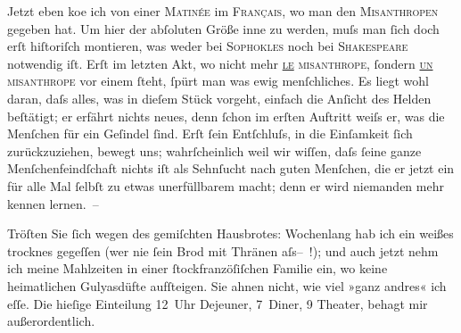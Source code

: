 \pstart
           Jetzt eben ko{\geminationm}e ich von einer \textsc{Matinée} im \textsc{Français}, wo man den \textsc{Misanthropen} gegeben hat. Um hier der abſoluten Größe inne zu werden, muſs man ſich doch
               erſt hiſtoriſch montieren, was weder bei \textsc{Sophokles} noch bei \textsc{Shakespeare} notwendig iſt. Erſt im letzten Akt, {\pb}wo nicht mehr
                  \textsc{\uline{le} misanthrope}, ſondern \textsc{\uline{un} misanthrope} vor einem ſteht, ſpürt man was
               ewig menſchliches. Es liegt wohl daran, daſs alles, was in dieſem Stück vorgeht, einfach die Anſicht des
               Helden beſtätigt; er erfährt nichts neues, denn ſchon im erſten Auftritt weiſs er,
               was die Menſchen für ein Geſindel ſind. Erſt ſein Entſchluſs, in die Einſamkeit ſich
               zurückzuziehen, bewegt uns; wahrſcheinlich weil wir wiſſen, daſs ſeine ganze
               Menſchenfeindſchaft nichts {\pb}iſt als Sehnſucht nach guten
               Menſchen, die er jetzt ein für alle Mal ſelbſt zu etwas unerfüllbarem macht; denn er
               wird niemanden mehr kennen lernen. –\pend
           
\pstart
           Tröſten Sie ſich wegen des gemiſchten Hausbrotes: Wochenlang hab ich ein weißes
               trocknes gegeſſen (wer nie ſein Brod mit Thränen
                  aſs– !); und auch jetzt nehm ich meine Mahlzeiten in einer ſtockfranzöſiſchen Familie ein, wo keine heimatlichen {\pb}Gulyasdüfte aufſteigen. Sie ahnen nicht, wie viel »ganz
               andres« ich eſſe. Die hieſige Einteilung 12 Uhr Dejeuner, 7 Diner, 9 Theater, behagt
               mir außerordentlich.\pend
           
